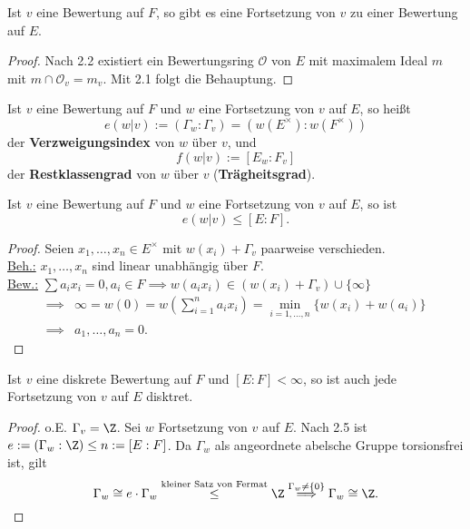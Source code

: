 \begin{korollar}
    Ist $v$ eine Bewertung auf $F$, so gibt es eine Fortsetzung von $v$ zu einer Bewertung auf $E$.
\end{korollar}
\begin{proof}
    Nach 2.2 existiert ein Bewertungsring $\mathcal{O}$ von $E$ mit maximalem Ideal $m$ mit
    $m \cap \mathcal{O}_v = m_v$. Mit 2.1 folgt die Behauptung.
\end{proof}

\begin{definition}
    Ist $v$ eine Bewertung auf $F$ und $w$ eine Fortsetzung von $v$ auf $E$, so heißt
    $$ e(w|v) := (\Gamma_w: \Gamma_v) = (w(E^\times):w(F^\times))$$
    der \textbf{Verzweigungsindex} von $w$ über $v$, und 
    $$ f(w|v) := [E_w : F_v]$$
    der \textbf{Restklassengrad} von $w$ über $v$ (\textbf{Trägheitsgrad}). 
    
    
    \begin{figure}[H]
        \centering
    \end{figure}
\end{definition}

\begin{lemma}
    Ist $v$ eine Bewertung auf $F$ und $w$ eine Fortsetzung von $v$ auf $E$, so ist
    $$ e(w|v) \leq [E:F].$$
\end{lemma}
\begin{proof}
    Seien $x_1,\ldots,x_n \in E^\times$ mit $w(x_i) + \Gamma_v$ paarweise verschieden.\\
    \underline{Beh.:} $x_1,\ldots,x_n$ sind linear unabhängig über $F$.\\
    \underline{Bew.:} $\sum\limits a_i x_i = 0, a_i \in F \implies w(a_ix_i) \in (w(x_i)+\Gamma_v)\cup \{\infty\}$
    \begin{align*}
        \implies & \infty = w(0) = w\left(\sum\limits_{i=1}^na_ix_i\right) = \min\limits_{i=1,\ldots,n}\{w(x_i)+w(a_i)\}\\
        \implies & a_1,\ldots,a_n = 0.
    \end{align*}
\end{proof}

\begin{satz}
    Ist $v$ eine diskrete Bewertung auf $F$ und $[E:F] < \infty$, so ist auch jede Fortsetzung von $v$ auf $E$ disktret.
\end{satz}
\begin{proof}
    o.E. $\Gamma_v = \Z$. Sei $w$ Fortsetzung von $v$ auf $E$.
    Nach 2.5 ist $e:=(\Gamma_w:\Z) \leq n := [E:F]$.
    Da $\Gamma_w$ als angeordnete abelsche Gruppe torsionsfrei ist, gilt
    $$ \Gamma_w \cong e \cdot \Gamma_w \stackrel{\text{kleiner Satz von Fermat}}{\leq} \Z
    \stackrel{\Gamma_w \ne \{0\}}{\implies} \Gamma_w \cong \Z.$$
\end{proof}

